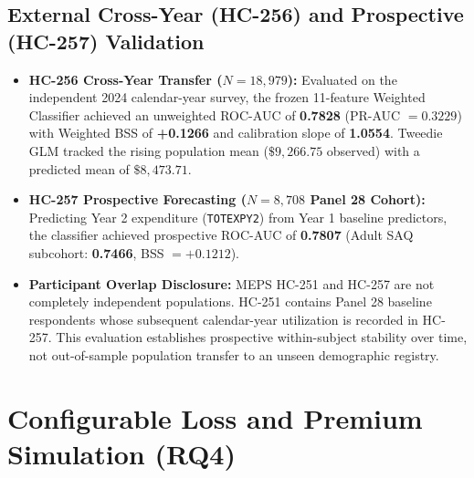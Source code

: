 \documentclass[runningheads]{llncs}
\begin{document}
\subsection{External Cross-Year (HC-256) and Prospective (HC-257) Validation}
\begin{itemize}
    \item \textbf{HC-256 Cross-Year Transfer ($N = 18,979$):} Evaluated on the independent 2024 calendar-year survey, the frozen 11-feature Weighted Classifier achieved an unweighted ROC-AUC of \textbf{0.7828} (PR-AUC $= 0.3229$) with Weighted BSS of \textbf{+0.1266} and calibration slope of \textbf{1.0554}. Tweedie GLM tracked the rising population mean ($\$9,266.75$ observed) with a predicted mean of \textbf{$\$8,473.71$}.
    \item \textbf{HC-257 Prospective Forecasting ($N = 8,708$ Panel 28 Cohort):} Predicting Year 2 expenditure (\texttt{TOTEXPY2}) from Year 1 baseline predictors, the classifier achieved prospective ROC-AUC of \textbf{0.7807} (Adult SAQ subcohort: \textbf{0.7466}, BSS $= +0.1212$).
    \item \textbf{Participant Overlap Disclosure:} MEPS HC-251 and HC-257 are not completely independent populations. HC-251 contains Panel 28 baseline respondents whose subsequent calendar-year utilization is recorded in HC-257. This evaluation establishes prospective within-subject stability over time, not out-of-sample population transfer to an unseen demographic registry.
\end{itemize}

\section{Configurable Loss and Premium Simulation (RQ4)}
\end{document}
